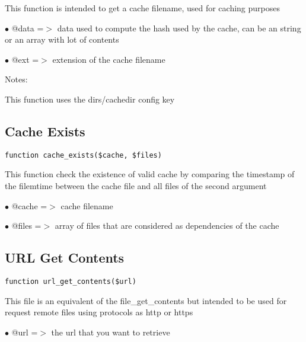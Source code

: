 \documentclass[a4paper]{book}
\begin{document}
This function is intended to get a cache filename, used for caching purposes

\begin{compactitem}
\item[\color{myblue}$\bullet$] @data =$>$ data used to compute the hash used by the cache, can be an string or
         an array with lot of contents
\item[\color{myblue}$\bullet$] @ext  =$>$ extension of the cache filename
\end{compactitem}

Notes:

This function uses the dirs/cachedir config key

\hypertarget{toc123}{}
\subsection{Cache Exists}

\begin{lstlisting}
function cache_exists($cache, $files)
\end{lstlisting}

This function check the existence of valid cache by comparing the timestamp
of the filemtime between the cache file and all files of the second argument

\begin{compactitem}
\item[\color{myblue}$\bullet$] @cache =$>$ cache filename
\item[\color{myblue}$\bullet$] @files =$>$ array of files that are considered as dependencies of the cache
\end{compactitem}

\hypertarget{toc124}{}
\subsection{URL Get Contents}

\begin{lstlisting}
function url_get_contents($url)
\end{lstlisting}

This file is an equivalent of the file\_get\_contents but intended to be used
for request remote files using protocols as http or https

\begin{compactitem}
\item[\color{myblue}$\bullet$] @url =$>$ the url that you want to retrieve
\end{compactitem}
\end{document}
